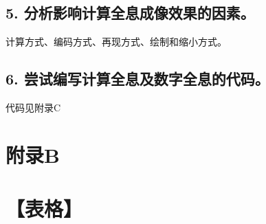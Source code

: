 \documentclass[10pt,a4paper,twoside,UTF8]{ctexart}
\begin{document}
\subsection*{5. 分析影响计算全息成像效果的因素。}
计算方式、编码方式、再现方式、绘制和缩小方式。
\subsection*{6. 尝试编写计算全息及数字全息的代码。}
代码见附录C
\begin{figure}[H]
	\centering
	\caption{}
\end{figure}

\newpage
\section*{\LARGE 附录B}
\section*{【表格】}
\end{document}
